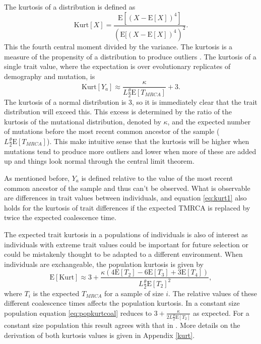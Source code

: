 \documentclass{article}
\newcommand{\T}{\frac{\theta}{2}}
\newcommand{\E}{\mathrm{E}}
\begin{document}
The kurtosis of a distribution is defined as
\begin{equation*}
  \mbox{Kurt}[X]=\frac{\E[(X-\E[X])^4]}{(\E[(X-\E[X])^4)^2}.
\end{equation*}
This the fourth central moment divided by the variance. The kurtosis is a
measure of the propensity of a distribution to produce outliers
\citep{Westfall2014}. The kurtosis of a single trait value, where the
expectation is over evolutionary replicates of demography and mutation, is 
\begin{equation}
  \label{eq:kurt1}
  \mbox{Kurt}[Y_a] \approx \frac{\kappa}{L\T \E[T_{MRCA}]} + 3.
\end{equation}
The kurtosis of a normal distribution is $3$, so it is immediately clear that
the trait distribution will exceed this. This excess is determined by the ratio
of the kurtosis of the mutational distribution, denoted by $\kappa$, and the
expected number of mutations before the most recent common ancestor of the
sample ($L\T \E[T_{MRCA}]$). This make intuitive sense that the kurtosis will be
higher when mutations tend to produce more outliers and lower when more of these
are added up and things look normal through the central limit theorem. 

As mentioned before, $Y_a$ is defined relative to the value of the most recent
common ancestor of the sample and thus can't be observed. What is observable are
differences in trait values between individuals, and equation \eqref{eq:kurt1}
also holds for the kurtosis of trait differences if the expected TMRCA is
replaced by twice the expected coalescence time. 

The expected trait kurtosis in a populations of individuals is also of interest
as individuals with extreme trait values could be important for future selection
or could be mistakenly thought to be adapted to a different environment. When
individuals are exchangeable, the population kurtosis is given by
\begin{equation}
  \label{eq:popkurtcoal}
  \E[\mbox{Kurt}] \approx 3 + \frac{\kappa( 4\E[T_2] - 6\E[T_3] + 
    3\E[T_4])}{L \T \E[T_2]^2},
\end{equation}
where $T_i$ is the expected $T_{MRCA}$ for a sample of size $i$. The relative
values of these different coalescence times affects the population kurtosis. In
a constant size population equation \eqref{eq:popkurtcoal} reduces to $3 +
\frac{\kappa}{2L\T \E[T_2]}$ as expected. For a constant size population this
result agrees with that in \citet{Schraiber2015}. More details on the derivation
of both kurtosis values is given in Appendix \ref{kurt}.
\end{document}
